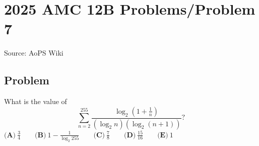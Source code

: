 \documentclass[12pt]{article}
\begin{document}
\section*{{2025 AMC 12B Problems/Problem 7}}
Source: AoPS Wiki

\subsection*{Problem}
What is the value of \[\sum_{n = 2}^{255}\frac{\log_{2}\left(1 + \tfrac{1}{n}\right)}{\left(\log_{2}n\right)\left(\log_{2}(n + 1)\right)}?\] $\textbf{(A)}~\frac{3}{4} \qquad \textbf{(B)}~1 -\frac{1}{\log_{2}255} \qquad \textbf{(C)}~\frac{7}{8} \qquad \textbf{(D)}~\frac{15}{16} \qquad \textbf{(E)}~1$
\end{document}

